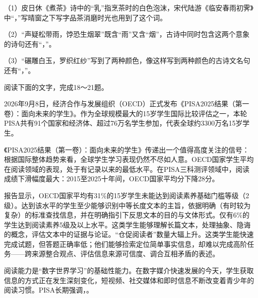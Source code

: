 \documentclass[11pt,a4paper]{ctexart}
\begin{document}

\par\vspace{2.2em}


（1）皮日休《煮茶》诗中的“乳”指烹茶时的白色泡沫，宋代陆游《临安春雨初霁》中“\blank[6.5em]，\blank[6.5em]”写晴窗之下写字品茶消磨时光也用到了这个词。

（2）“声疑松带雨，饽恐生烟翠”既含“雨”又含“烟”，古诗中同时包含这两个意象的诗句还有“\blank[6.5em]，\blank[6.5em]”。

（3）“碾雕白玉，罗织红纱”写到了两种颜色，像这样写到两种颜色的古诗文名句\linebreak 还有“\blank[6.5em]，\blank[6.5em]”。

阅读下面的文字，完成18～21题。

{\ywkai 2026年9月8日，经济合作与发展组织（OECD）正式发布《PISA2025结果（第一卷）：面向未来的学生》。作为全球规模最大的15岁学生国际比较评估之一，本轮PISA共有91个国家和经济体、超过76万名学生参加，代表全球约3300万名15岁学生。

《PISA2025结果（第一卷）：面向未来的学生》传递出一个值得高度关注的信号：根据国际整体趋势来看，全球学生学习表现仍然不尽如人意。OECD国家学生平均在阅读领域的表现，处于有记录以来的最低水平。在PISA三科测评领域中，阅读成绩下滑幅度最大：2015至2025十年间，OECD国家平均分下降28分。

报告显示，OECD国家平均有31\%的15岁学生未能达到阅读素养基础门槛等级（2级）。达到该水平的学生至少能够识别中等长度文本的主旨，依据明确（有时较为复杂）的标准查找信息，并在明确指引下反思文本的目的与文体形式。仅有6\%的学生达到阅读素养5级及以上水平。这类学生能够理解长篇文本，处理抽象、隐诲的概念，评估文本中的证据与论证。“仓促阅读者”数量大辐上升。这类学生能快速完成试题，但答题正确率低；他们能够捡索定位简单事实信息，却难以完成高阶任务——跨来源整合观点、评估信息来源可信度、调合互相矛盾的表述。

阅读能力是“数字世界学习”的基础性能力。在数字媒介快速发展的今天，学生获取信息的方式正在发生深刻变化，短视频、社交媒体和即时信息不断改变着青少年的阅读习惯。PISA长期强调，\blank[8em]。\par}

\end{document}
